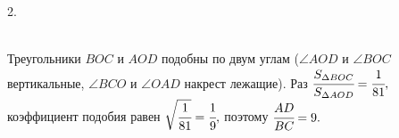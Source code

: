 2. \begin{figure}[ht!]
\end{figure}\\
Треугольники $BOC$ и $AOD$ подобны по двум углам ($\angle AOD$ и $\angle BOC$ вертикальные, $\angle BCO$ и $\angle OAD$ накрест лежащие). Раз
$\cfrac{S_{\Delta BOC}}{S_{\Delta AOD}}=\cfrac{1}{81},$ коэффициент подобия равен $\sqrt{\cfrac{1}{81}}=\cfrac{1}{9},$ поэтому $\cfrac{AD}{BC}=9.$\\
